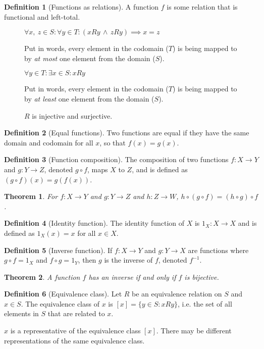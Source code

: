 \documentclass{article}
\theoremstyle{plain}
\newtheorem{theorem}{Theorem}[section]
\numberwithin{theorem}{subsection}
\theoremstyle{definition}
\newtheorem{definition}{Definition}[section]
\numberwithin{definition}{subsection}
\theoremstyle{remark}
\numberwithin{note}{subsection}
\begin{document}
\begin{definition}[Functions as relations]
    A function $f$ is some relation that is functional and left-total.
\end{definition}
%
\begin{figure}[H]
	\begin{mdframed}[style=exampledefault,frametitle={Function Properties}]
	\begin{description}[style=sameline]
		\item[Injective (one-to-one)]
			$\forall x,\: z \in S : \forall y \in T
			: (xRy \,\land\, zRy) \implies x = z$

			Put in words, every element in the codomain ($T$)
			is being mapped to by \textit{at most} one element from the domain ($S$).
		\item[Surjective (onto)]
			$\forall y \in T : \exists x \in S : xRy$

			Put in words, every element in the codomain ($T$)
			is being mapped to by \textit{at least} one element from the domain ($S$).
		\item[Bijective]
			$R$ is injective and surjective.
	\end{description}
	\end{mdframed}
\end{figure}
%
\begin{definition}[Equal functions]
    Two functions are equal if they have the same domain and codomain
    for all $x$, so that $f(x) = g(x)$.
\end{definition}
%
\begin{definition}[Function composition]
    The composition of two functions $f:X \to Y$ and $g:Y \to Z$,
    denoted $g \circ f$, maps $X$ to $Z$, and is defined as
    $(g \circ f)(x) = g(f(x))$.
\end{definition}
%
\begin{theorem}
    For $f:X \to Y$ and $g:Y \to Z$ and  $h:Z \to W$,
    $h \circ (g \circ f) = (h \circ g) \circ f$.
\end{theorem}
%
\begin{definition}[Identity function]
    The identity function of $X$ is $1_X:X \to X$ and is defined as
    $1_X (x)=x$ for all $x \in X$.
\end{definition}
%
\begin{definition}[Inverse function]
    If $f:X \to Y$ and $g:Y \to X$ are functions where
    $g \circ f = 1_X$ and $f \circ g = 1_Y$,
    then $g$ is the inverse of $f$, denoted $f^{-1}$.
\end{definition}
%
\begin{theorem}
    A function $f$ has an inverse if and only if $f$ is bijective.
\end{theorem}
%
\begin{definition}[Equivalence class]
    Let $R$ be an equivalence relation on $S$ and $x \in S$.
    The equivalence class of $x$ is $[x] = \{y \in S : xRy\}$,
    i.e. the set of all elements in $S$ that are related to $x$.

    $x$ is a representative of the equivalence class $[x]$.
    There may be different representations of the same equivalence class.
\end{definition}
%
\end{document}
